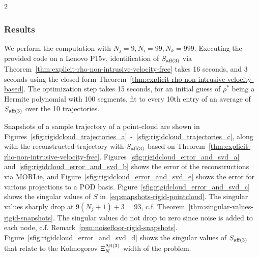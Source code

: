 \documentclass{article}
\begin{document}
\begin{multicols}{2}
\subsubsection{Results}
We perform the computation with $N_j = 9, N_i  = 99, N_k = 999$. Executing the provided code on a Lenovo P15v, identification of $S_{\textnormal{aff}(3)}$ via Theorem~\ref{thm:explicit-rho-non-intrusive-velocity-free} takes 16 seconds, and 3 seconds using the closed form Theorem~\ref{thm:explicit-rho-non-intrusive-velocity-based}. The optimization step takes 15 seconds, for an initial guess of $\rho^*$ being a Hermite polynomial with 100 segments, fit to every 10th entry of an average of $S_{\textnormal{aff}(3)}$ over the 10 trajectories.

Snapshots of a sample trajectory of a point-cloud are shown in Figures~\ref{sfig:rigidcloud_trajectories_a}~-~\ref{sfig:rigidcloud_trajectories_c}, along with the reconstructed trajectory with $S_{\textnormal{aff}(3)}$ based on Theorem~\ref{thm:explicit-rho-non-intrusive-velocity-free}. Figures~\ref{sfig:rigidcloud_error_and_svd_a} and~\ref{sfig:rigidcloud_error_and_svd_b} shows the error of the reconstructions via MORLie, and Figure~\ref{sfig:rigidcloud_error_and_svd_e} shows the error for various projections to a POD basis. Figure~\ref{sfig:rigidcloud_error_and_svd_c} shows the singular values of $S$ in~\eqref{eq:snapshots-rigid-pointcloud}. The singular values sharply drop at $9 (N_j+1)+3 = 93$, c.f. Theorem~\ref{thm:singular-values-rigid-snapshots}. The singular values do not drop to zero since noise is added to each node, c.f. Remark~\ref{rem:noisefloor-rigid-snapshots}. Figure~\ref{sfig:rigidcloud_error_and_svd_d} shows the singular values of $S_{\textnormal{aff}(3)}$ that relate to the Kolmogorov $\Xi^{\textnormal{Aff}(3)}_N$ width of the problem. 



\end{multicols}
\end{document}
